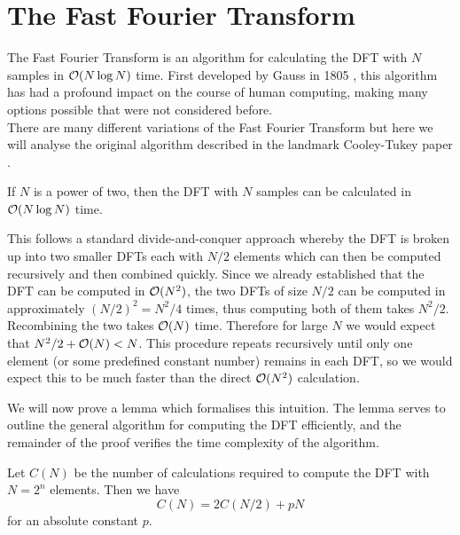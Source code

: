 \section{The Fast Fourier Transform}

The Fast Fourier Transform is an algorithm for calculating the DFT with $N$ samples in $\mathcal O(N \log N)$ time. First developed by Gauss in 1805 \cite{gauss}, this algorithm has had a profound impact on the course of human computing, making many options possible that were not considered before.\\
There are many different variations of the Fast Fourier Transform but here we will analyse the original algorithm described in the landmark Cooley-Tukey paper \cite{10.2307/2003354}.

\begin{theorem}\label{thm:fft}
    If $N$ is a power of two, then the DFT with $N$ samples can be calculated in $\mathcal O(N\log N)$ time.
\end{theorem}

This follows a standard divide-and-conquer approach whereby the DFT is broken up into two smaller DFTs each with $N/2$ elements which can then be computed recursively and then combined quickly. Since we already established that the DFT can be computed in $\mathcal O(N^2)$, the two DFTs of size $N/2$ can be computed in approximately $(N/2)^2 = N^2/4$ times, thus computing both of them takes $N^2 / 2$. Recombining the two takes $\mathcal O(N)$ time. Therefore for large $N$ we would expect that $N^2/2 + \mathcal O(N) < N$. This procedure repeats recursively until only one element (or some predefined constant number) remains in each DFT, so we would expect this to be much faster than the direct $\mathcal O(N^2)$ calculation.

We will now prove a lemma which formalises this intuition. The lemma serves to outline the general algorithm for computing the DFT efficiently, and the remainder of the proof verifies the time complexity of the algorithm.

\begin{lemma}
    Let $C(N)$ be the number of calculations required to compute the DFT with $N = 2^n$ elements. Then we have
    \begin{equation}
        C(N) = 2 C(N/2) + pN \label{eq:fftlem}
    \end{equation}
    for an absolute constant $p$.
\end{lemma}

